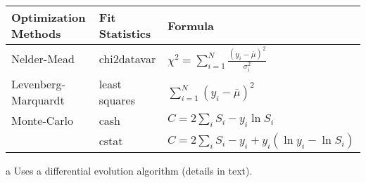 \begin{threeparttable}
\centering
\begin{tabular}{lll}
    \toprule
    Optimization Methods & Fit Statistics & Formula \\ %
    \midrule
    Nelder-Mead & chi2datavar & $\chi^{2} = \sum_{i=1}^{N} \frac{(y_{i} - \overline{\mu})^{2}}{\sigma_{i}^{2}}$ \\ %
    Levenberg-Marquardt & least squares & $\sum_{i=1}^{N} (y_{i} - \overline{\mu})^{2}$ \\ %
    Monte-Carlo\tnote{a} & cash & $C = 2 \sum_{i} S_{i} - y_{i} \ln{S_{i}}$ \\ %
    ~ & cstat & $C = 2 \sum_{i} S_{i} - y_{i} + y_{i} (\ln{y_{i}} - \ln{S_{i}})$ \\ %
    \bottomrule
\end{tabular}
\begin{tablenotes}
\item [a] Uses a differential evolution algorithm (details in text).
\end{tablenotes}
\end{threeparttable}